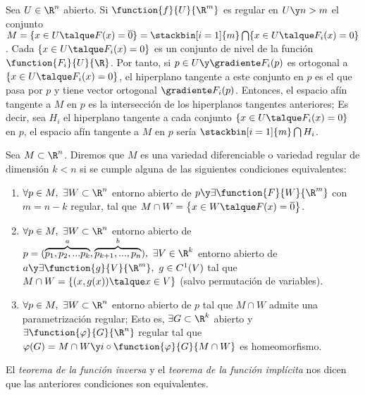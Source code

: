 \begin{observacion} Sea $U\in\R^n$ abierto. Si $\function{f}{U}{\R^m}$ es regular en $U\y n>m$ el conjunto $M=\{x\in U\talque F(x)=\overline{0}\}=\stackbin[i=1]{m}\bigcap\{x\in U\talque F_i(x)=0\}$. Cada $\{x\in U\talque F_i(x)=0\}$ es un conjunto de nivel de la función $\function{F_i}{U}{\R}$. Por tanto, si $p\in U\y \gradiente F_i(p)$ es ortogonal a $\{x\in U\talque F_i(x)=0\}$, el hiperplano tangente a este conjunto en $p$ es el que pasa por $p$ y tiene vector ortogonal $\gradiente F_i(p)$. Entonces, el espacio afín tangente a $M$ en $p$ es la intersección de los hiperplanos tangentes anteriores; Es decir, sea $H_i$ el hiperplano tangente a cada conjunto $\{x\in U\talque F_i(x)=0\}$ en $p$, el espacio afín tangente a $M$ en $p$ sería $\stackbin[i=1]{m}\bigcap H_i$.
\end{observacion}

\begin{defi} Sea $M\subset\R^n$. Diremos que $M$ es una variedad diferenciable o variedad regular de dimensión $k<n$ si se cumple alguna de las siguientes condiciones equivalentes:
\begin{enumerate}[1)]
\item $\forall p\in M,\ \exists W\subset\R^n$ entorno abierto de $p\y\exists\function{F}{W}{\R^m}$ con $m=n-k$ regular, tal que $M\cap W=\left\{x\in W\talque F(x)=\overline{0}\right\}$.
\item $\forall p\in M,\ \exists W\subset\R^n$ entorno abierto de $p=(\overset{a}{\overbrace{p_1,p_2,...p_k}},\overset{b}{\overbrace{p_{k+1},...,p_n}}),\ \exists V\in\R^k$ entorno abierto de $a\y\exists\function{g}{V}{\R^m},\ g\in C^1(V)$ tal que $M\cap W=\{(x,g(x))\talque x\in V\}$ (salvo permutación de variables).
\item $\forall p\in M,\ \exists W\subset\R^n$ entorno abierto de $p$ tal que $M\cap W$ admite una parametrización regular; Esto es, $\exists G\subset\R^k$ abierto y $\exists\function{\varphi}{G}{\R^n}$ regular tal que $\varphi(G)=M\cap W\y\\
i\circ\function{\varphi}{G}{M\cap W}$ es homeomorfismo.
\end{enumerate}
\begin{nota}El \textit{teorema de la función inversa} y el \textit{teorema de la función implícita} nos dicen que las anteriores condiciones son equivalentes.\end{nota}
\end{defi}

